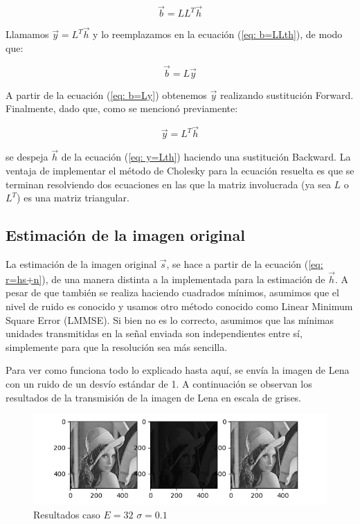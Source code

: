 \begin{equation} 
\vec{b} = L L^T \vec{h} 
\label{eq: b=LLth}
\end{equation} 

Llamamos $\vec{y} = L^T \vec{h}$ y lo reemplazamos en la ecuaci\'on (\ref{eq: b=LLth}), de modo que:

\begin{equation} 
\vec{b} = L \vec{y}
\label{eq: b=Ly}
\end{equation} 

A partir de la ecuaci\'on (\ref{eq: b=Ly}) obtenemos $ \vec{y}$ realizando sustituci\'on Forward. Finalmente, dado que, como se mencion\'o previamente:

 \begin{equation} 
\vec{y} = L^T \vec{h} 
\label{eq: y=Lth}
\end{equation}

se despeja $\vec{h}$ de la ecuaci\'on (\ref{eq: y=Lth}) haciendo una sustituci\'on Backward. La ventaja de implementar el m\'etodo de Cholesky para la ecuaci\'on resuelta es que se terminan resolviendo dos ecuaciones en las que la matriz involucrada (ya sea $L$ o $L^T$) es una matriz triangular.

\subsection{Estimaci\'on de la imagen original}

La estimaci\'on de la imagen original $\vec{s}$, se hace a partir de la ecuaci\'on (\ref{eq: r=hs+n}), de una manera distinta a la implementada para la estimaci\'on de  $\vec{h}$. A pesar de que tambi\'en se realiza haciendo cuadrados m\'inimos, asumimos que el nivel de ruido es conocido y usamos otro m\'etodo  conocido como Linear Minimum Square Error (LMMSE). Si bien no es lo correcto, asumimos que las m\'inimas unidades transmitidas en la se\~nal enviada son independientes entre s\'i, simplemente para que la resoluci\'on sea m\'as sencilla. 


Para ver como funciona todo lo explicado hasta aqu\'i, se env\'ia la imagen de Lena con un ruido de un desv\'io est\'andar de 1. A continuaci\'on se observan los resultados de la transmisi\'on de la imagen de Lena en escala de grises.
 

\begin{figure}[H]
	\includegraphics[scale=0.9]{Imagenes/E32S01}
	\centering
	\caption{Resultados caso $E=32$ $\sigma = 0.1$ }
\end{figure}
 
